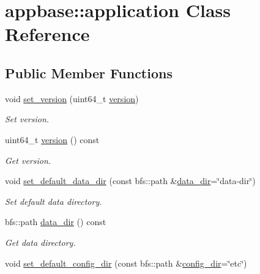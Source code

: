 \hypertarget{classappbase_1_1application}{}\section{appbase\+:\+:application Class Reference}
\label{classappbase_1_1application}
\subsection*{Public Member Functions}
\begin{DoxyCompactItemize}
\item 
void \mbox{\hyperlink{classappbase_1_1application_a2794807d31e9f29f1327811dda40820d}{set\+\_\+version}} (uint64\+\_\+t \mbox{\hyperlink{classappbase_1_1application_ae4ec67aea2aa3bab8800c875590245b2}{version}})
\begin{DoxyCompactList}\small\item\em Set version. \end{DoxyCompactList}\item 
uint64\+\_\+t \mbox{\hyperlink{classappbase_1_1application_ae4ec67aea2aa3bab8800c875590245b2}{version}} () const
\begin{DoxyCompactList}\small\item\em Get version. \end{DoxyCompactList}\item 
void \mbox{\hyperlink{classappbase_1_1application_af81fa07af200b5b24049ed5d197a864f}{set\+\_\+default\+\_\+data\+\_\+dir}} (const bfs\+::path \&\mbox{\hyperlink{classappbase_1_1application_a5dfd3cfb1124c57963fa17b3f4aabbe1}{data\+\_\+dir}}=\char`\"{}data-\/dir\char`\"{})
\begin{DoxyCompactList}\small\item\em Set default data directory. \end{DoxyCompactList}\item 
bfs\+::path \mbox{\hyperlink{classappbase_1_1application_a5dfd3cfb1124c57963fa17b3f4aabbe1}{data\+\_\+dir}} () const
\begin{DoxyCompactList}\small\item\em Get data directory. \end{DoxyCompactList}\item 
void \mbox{\hyperlink{classappbase_1_1application_a49901c76b365337c933e6485649a50b6}{set\+\_\+default\+\_\+config\+\_\+dir}} (const bfs\+::path \&\mbox{\hyperlink{classappbase_1_1application_a9b2c99749c7209e218a3dbbe51cfdeac}{config\+\_\+dir}}=\char`\"{}etc\char`\"{})

\end{DoxyCompactItemize}
